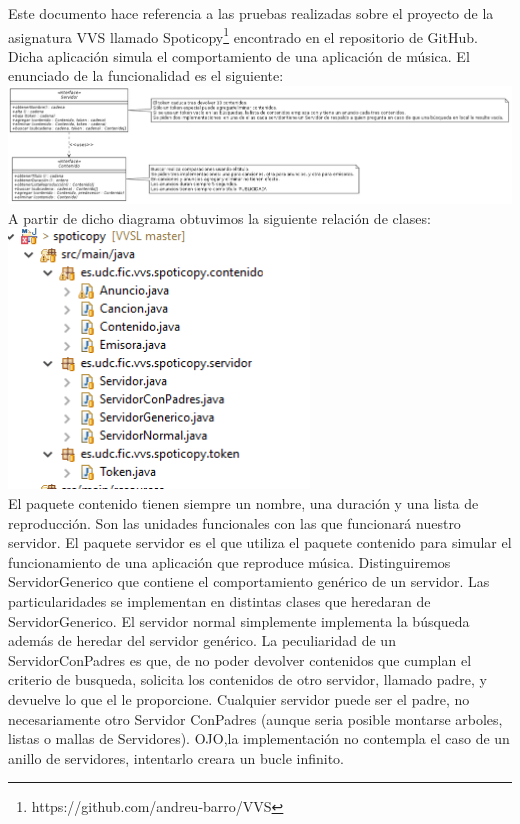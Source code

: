 \documentclass[12pt, a4paper, titlepage]{article}
\begin{document}
	Este documento hace referencia a las pruebas realizadas sobre el proyecto de la asignatura VVS llamado Spoticopy\footnote{https://github.com/andreu-barro/VVS} encontrado en el repositorio de GitHub. Dicha aplicación simula el comportamiento de una aplicación de música. El enunciado de la funcionalidad es el siguiente:\\
	\includegraphics[width=18cm]{Imagenes/DiagramaSimple.png}\\
	A partir de dicho diagrama obtuvimos la siguiente relación de clases:\\
		\includegraphics[width=8cm]{Imagenes/Clases.png} \\
	El paquete contenido tienen siempre un nombre, una duración y una lista de reproducción. Son las unidades funcionales con las que funcionará nuestro servidor.
	El paquete servidor es el que utiliza el paquete contenido para simular el funcionamiento de una aplicación que reproduce música. Distinguiremos ServidorGenerico que contiene el comportamiento genérico de un servidor. Las particularidades se implementan en distintas clases que heredaran de ServidorGenerico.
	El servidor normal simplemente implementa la búsqueda además de heredar del servidor genérico.
	La peculiaridad de un ServidorConPadres es que, de no poder devolver contenidos que cumplan el criterio de busqueda, solicita los contenidos de otro servidor, llamado padre, y devuelve lo que el le proporcione. Cualquier servidor puede ser el padre, no necesariamente otro Servidor ConPadres (aunque seria posible montarse arboles, listas o mallas de Servidores). OJO,la implementación no contempla el caso de un anillo de servidores, intentarlo creara un bucle infinito.
\end{document}
